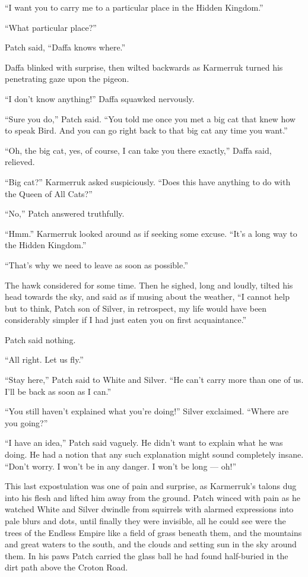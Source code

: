\documentclass[ebook,oneside,openany,17pt]{memoir}
\newenvironment{tolerant}[1]{%
  \par\tolerance=#1\relax
}{%
  \par
}
\begin{document}
“I want you to carry me to a particular place in the Hidden Kingdom.”

“What particular place?”

Patch said, “Daffa knows where.”

\begin{tolerant}{1000}
Daffa blinked with surprise, then wilted backwards as Karmerruk turned
his penetrating gaze upon the pigeon.
\end{tolerant}

“I don’t know anything!” Daffa squawked nervously.

“Sure you do,” Patch said. “You told me once you met a big cat that
knew how to speak Bird. And you can go right back to that big cat any
time you want.”

“Oh, the big cat, yes, of course, I can take you there exactly,” Daffa
said, relieved.

“Big cat?” Karmerruk asked suspiciously. “Does this have anything to
do with the Queen of All Cats?”

“No,” Patch answered truthfully.

“Hmm.” Karmerruk looked around as if seeking some excuse. “It’s a long
way to the Hidden Kingdom.”

“That’s why we need to leave as soon as possible.”

\begin{tolerant}{1000}
The hawk considered for some time. Then he sigh\-ed, long and loudly,
tilted his head towards the sky, and said as if musing about the
weather, “I cannot help but to think, Patch son of Silver, in
retrospect, my life would have been considerably simpler if I had just
eaten you on first acquaintance.”
\end{tolerant}

Patch said nothing.

“All right. Let us fly.”

“Stay here,” Patch said to White and Silver. “He can’t carry more than
one of us. I’ll be back as soon as I can.”

“You still haven’t explained what you’re doing!” Silver
exclaimed. “Where are you going?”

“I have an idea,” Patch said vaguely. He didn’t want to explain what
he was doing. He had a notion that any such explanation might sound
completely insane. “Don’t worry. I won’t be in any danger. I won’t be
long — oh!”

This last expostulation was one of pain and surprise, as Karmerruk’s
talons dug into his flesh and lifted him away from the ground. Patch
winced with pain as he watched White and Silver dwindle from squirrels
with alarmed expressions into pale blurs and dots, until finally they
were invisible, all he could see were the trees of the Endless Empire
like a field of grass beneath them, and the mountains and great waters
to the south, and the clouds and setting sun in the sky around
them. In his paws Patch carried the glass ball he had found
half-buried in the dirt path above the Croton Road.
\end{document}
